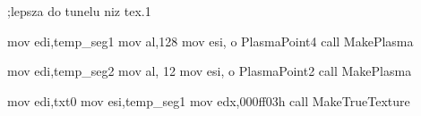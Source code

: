 ;lepsza do tunelu niz tex.1

	mov   edi,temp_seg1
	mov   al,128
	mov   esi, o PlasmaPoint4
	call  MakePlasma

	mov   edi,temp_seg2
	mov   al, 12
	mov   esi, o PlasmaPoint2
	call  MakePlasma

	mov   edi,txt0
	mov   esi,temp_seg1
	mov   edx,000ff03h
	call  MakeTrueTexture

